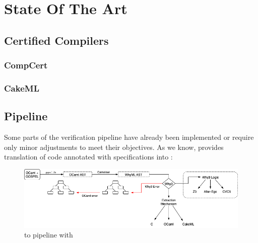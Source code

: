 
%

\chapter{State Of The Art}
\label{cha:State_Of_The_Art}

\section{Certified Compilers}
\label{sec:Certified_Compilers}

\subsection{CompCert}
\label{sec:CompCert}

\subsection{CakeML}
\label{sec:CakeML}



\section{Pipeline}
\label{sec:Pipeline}

Some parts of the verification pipeline have already been implemented or require only minor adjustments to meet their 
objectives. As we know, \cameleer provides translation of \ocaml code annotated with \gospel specifications into \whyml :

\begin{figure}[H]
    \centering
    \includegraphics[width=\linewidth]{images/Cameleer.png}
    \caption{\ocaml to \whyml pipeline with \cameleer}
\end{figure}


